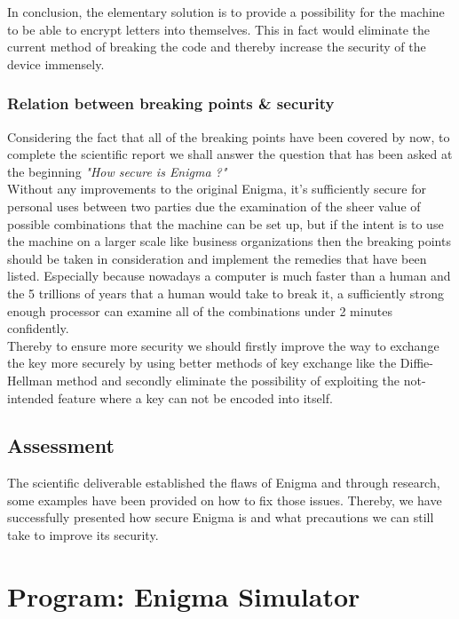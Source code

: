 \documentclass[conference,compsoc]{IEEEtran}
\begin{document}
In conclusion, the elementary solution is to provide a possibility for the machine to be able to encrypt letters into themselves. This in fact would eliminate the current method of breaking the code and thereby increase the security of the device immensely.\\

\subsubsection{Relation between breaking points \& security} Considering the fact that all of the breaking points have been covered by now, to complete the scientific report we shall answer the question that has been asked at the beginning \emph{"How secure is Enigma ?"}\\

Without any improvements to the original Enigma, it's sufficiently secure for personal uses between two parties due the examination of the sheer value of possible combinations that the machine can be set up, but if the intent is to use the machine on a larger scale like business organizations then the breaking points should be taken in consideration and implement the remedies that have been listed. Especially because nowadays a computer is much faster than a human and the 5 trillions of years that a human would take to break it, a sufficiently strong enough processor can examine all of the combinations under 2 minutes confidently.\\
Thereby to ensure more security we should firstly improve the way to exchange the key more securely by using better methods of key exchange like the Diffie-Hellman method and secondly eliminate the possibility of exploiting the not-intended feature where a key can not be encoded into itself.\\




\subsection{Assessment}
The scientific deliverable established the flaws of Enigma and through research, some examples have been provided on how to fix those issues. 
Thereby, we have successfully presented how secure Enigma is and what precautions we can still take to improve its security.\\

\section{Program: Enigma Simulator}
\label{sec-production}
\end{document}
